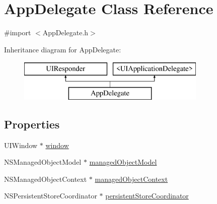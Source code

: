 \hypertarget{interface_app_delegate}{\section{App\-Delegate Class Reference}
\label{interface_app_delegate}
}


{\ttfamily \#import $<$App\-Delegate.\-h$>$}

Inheritance diagram for App\-Delegate\-:\begin{figure}[H]
\begin{center}
\leavevmode
\includegraphics[height=2.000000cm]{interface_app_delegate}
\end{center}
\end{figure}
\subsection*{Properties}
\begin{DoxyCompactItemize}
\item 
U\-I\-Window $\ast$ \hyperlink{interface_app_delegate_acf48ac24125e688cac1a85445cd7fac2}{window}
\item 
N\-S\-Managed\-Object\-Model $\ast$ \hyperlink{interface_app_delegate_a9f3cb4e87e96ee48a07e2b72cf3f6d13}{managed\-Object\-Model}
\item 
N\-S\-Managed\-Object\-Context $\ast$ \hyperlink{interface_app_delegate_a1fa650ded1ca9bb0eecda69d1f41cc1f}{managed\-Object\-Context}
\item 
N\-S\-Persistent\-Store\-Coordinator $\ast$ \hyperlink{interface_app_delegate_a4169fdb1085cc13479280e10d44c039a}{persistent\-Store\-Coordinator}
\end{DoxyCompactItemize}


